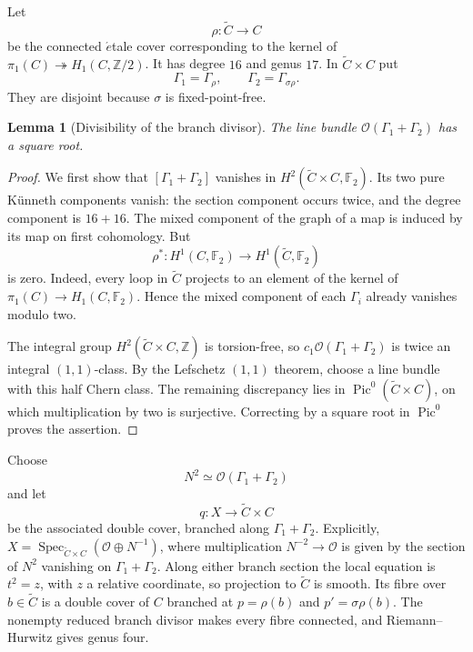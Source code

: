 \documentclass[11pt,a4paper,dvipsnames]{amsart}
\numberwithin{equation}{section}
\theoremstyle{plain}
\newtheorem{lemma}[theorem]{Lemma}
\theoremstyle{definition}
\newcommand{\cO}{\mathcal O}
\newcommand{\Pic}{\operatorname{Pic}}
\newcommand{\FF}{\mathbb F}
\newcommand{\ZZ}{\mathbb Z}
\begin{document}
Let
$$
 \rho:\widetilde C\longrightarrow C
$$
be the connected $\acute{e}$tale cover corresponding to the kernel of
$\pi_1(C)\twoheadrightarrow H_1(C,\ZZ/2)$.  It has degree $16$ and genus
$17$.  In $\widetilde C\times C$ put
$$
 \Gamma_1=\Gamma_\rho,
 \qquad
 \Gamma_2=\Gamma_{\sigma\rho}.
$$
They are disjoint because $\sigma$ is fixed-point-free.

\begin{lemma}[Divisibility of the branch divisor]
\label{lem:branch-divisibility}
The line bundle $\cO(\Gamma_1+\Gamma_2)$ has a square root.
\end{lemma}

\begin{proof}
We first show that $[\Gamma_1+\Gamma_2]$ vanishes in
$H^2(\widetilde C\times C,\FF_2)$.  Its two pure K\"unneth components vanish:
the section component occurs twice, and the degree component is
$16+16$.  The mixed component of the graph of a map is induced by its map
on first cohomology.  But
$$
 \rho^*:H^1(C,\FF_2)\longrightarrow H^1(\widetilde C,\FF_2)
$$
is zero.  Indeed, every loop in $\widetilde C$ projects to an element of
the kernel of $\pi_1(C)\to H_1(C,\FF_2)$.  Hence the mixed component of
each $\Gamma_i$ already vanishes modulo two.

The integral group $H^2(\widetilde C\times C,\ZZ)$ is torsion-free, so
$c_1\cO(\Gamma_1+\Gamma_2)$ is twice an integral $(1,1)$-class.  By the
Lefschetz $(1,1)$ theorem, choose a line bundle with this half Chern class.
The remaining discrepancy lies in $\Pic^0(\widetilde C\times C)$, on which
multiplication by two is surjective.  Correcting by a square root in
$\Pic^0$ proves the assertion.
\end{proof}

Choose
\begin{equation}\label{eq:N}
 N^2\simeq\cO(\Gamma_1+\Gamma_2)
\end{equation}
and let
\begin{equation}\label{eq:double-cover}
 q:X\longrightarrow\widetilde C\times C
\end{equation}
be the associated double cover, branched along
$\Gamma_1+\Gamma_2$.  Explicitly,
$X=\operatorname{Spec}_{\widetilde C\times C}(\cO\oplus N^{-1})$,
where multiplication $N^{-2}\to\cO$ is given by the section of $N^2$
vanishing on $\Gamma_1+\Gamma_2$.  Along either branch section the local
equation is $t^2=z$, with $z$ a relative coordinate, so projection to
$\widetilde C$ is smooth.  Its fibre over $b\in\widetilde C$ is a double
cover of $C$ branched at $p=\rho(b)$ and $p'=\sigma\rho(b)$.
The nonempty reduced branch divisor makes every fibre connected, and
Riemann--Hurwitz gives genus four.
\end{document}
